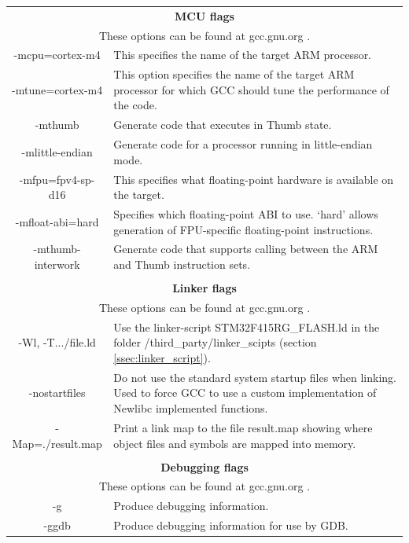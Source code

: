 \begin{table}[H]
	\centering
	\begin{tabular}{|c|p{10cm}|}
		\multicolumn{2}{c}{\textbf{MCU flags}} \\
		\multicolumn{2}{c}{These options can be found at gcc.gnu.org \cite{gcc_arm_options}.} \\
		\hline
		-mcpu=cortex-m4   &
		This specifies the name of the target ARM processor. \\
		\hline
		-mtune=cortex-m4  &
		This option specifies the name of the target ARM processor for which GCC should tune the performance of the code. \\
		\hline
		-mthumb           &
		Generate code that executes in Thumb state. \\
		\hline
		-mlittle-endian   &
		Generate code for a processor running in little-endian mode. \\
		\hline
		-mfpu=fpv4-sp-d16 &
		This specifies what floating-point hardware is available on the target. \\
		\hline
		-mfloat-abi=hard  &
		Specifies which floating-point ABI to use.
		`hard' allows generation of FPU-specific floating-point instructions. \\
		\hline
		-mthumb-interwork &
		Generate code that supports calling between the ARM and Thumb instruction sets. \\

		\hline
		\multicolumn{2}{c}{} \\
		\multicolumn{2}{c}{\textbf{Linker flags}} \\
		\multicolumn{2}{c}{These options can be found at gcc.gnu.org \cite{gcc_linking_options}.} \\
		\hline
		-Wl, -T.../file.ld &
		Use the linker-script STM32F415RG\_FLASH.ld in the folder
		/third\_party/linker\_scipts (section \ref{ssec:linker_script}). \\
		\hline
		-nostartfiles   &
		Do not use the standard system startup files when linking.
		Used to force GCC to use a custom implementation of Newlibc implemented functions. \\
		\hline
		-Map=./result.map &
		Print a link map to the file result.map showing where object files and symbols are mapped into memory. \\

		\hline
		\multicolumn{2}{c}{} \\
		\multicolumn{2}{c}{\textbf{Debugging flags}} \\
		\multicolumn{2}{c}{These options can be found at gcc.gnu.org \cite{gcc_debug_options}.} \\
		\hline
		-g &
		Produce debugging information. \\
		\hline
		-ggdb &
		Produce debugging information for use by GDB. \\


\end{tabular}
\end{table}
